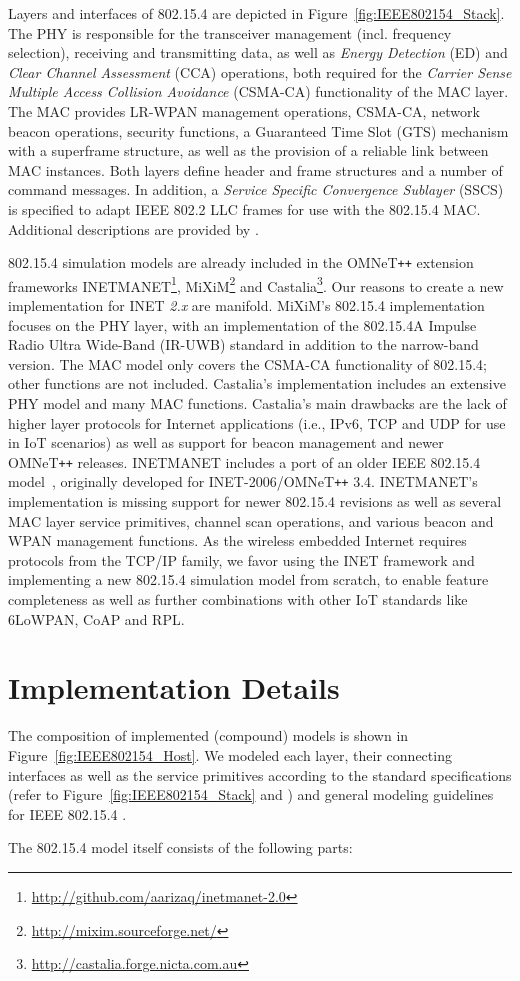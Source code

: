 \documentclass[conference,10pt]{IEEEtran}
\newcommand{\omnet}{{OMNeT\texttt{++}}\xspace}
\begin{document}
Layers and interfaces of 802.15.4 are depicted in Figure~\ref{fig:IEEE802154_Stack}. 
The PHY is responsible for the transceiver management (incl. frequency selection), receiving and transmitting data, as well as \emph{Energy Detection} (ED) and \emph{Clear Channel Assessment} (CCA) operations, both required for the \emph{Carrier Sense Multiple Access Collision Avoidance} (CSMA-CA) functionality of the MAC layer.
The MAC provides LR-WPAN management operations, CSMA-CA, network beacon operations, security functions, a Guaranteed Time Slot (GTS) mechanism with a superframe structure, as well as the provision of a reliable link between MAC instances.
Both layers define header and frame structures and a number of command messages.
In addition, a \emph{Service Specific Convergence Sublayer} (SSCS) is specified to adapt IEEE 802.2 LLC frames for use with the 802.15.4 MAC.
Additional descriptions are provided by \cite{IEEE802154}.
\par
802.15.4 simulation models are already included in the \omnet extension frameworks INETMANET\footnote{\url{http://github.com/aarizaq/inetmanet-2.0}}, MiXiM\footnote{\url{http://mixim.sourceforge.net/}} and Castalia\footnote{\url{http://castalia.forge.nicta.com.au}}.
Our reasons to create a new implementation for INET \emph{2.x} are manifold.
MiXiM's 802.15.4 implementation focuses on the PHY layer, with an implementation of the 802.15.4A Impulse Radio Ultra Wide-Band (IR-UWB) standard in addition to the narrow-band version. 
The MAC model only covers the CSMA-CA functionality of 802.15.4; other functions are not included.
Castalia's implementation includes an extensive PHY model and many MAC functions.
Castalia's main drawbacks are the lack of higher layer protocols for Internet applications (i.e., IPv6, TCP and UDP for use in IoT scenarios) as well as support for beacon management and newer \omnet releases.
INETMANET includes a port of an older IEEE 802.15.4 model~\cite{chen2007simulation}, originally developed for INET-2006/\omnet 3.4.
INETMANET's implementation is missing support for newer 802.15.4 revisions as well as several MAC layer service primitives, channel scan operations, and various beacon and WPAN management functions.
As the wireless embedded Internet requires protocols from the TCP/IP family, we favor using the INET framework and implementing a new 802.15.4 simulation model from scratch, to enable feature completeness as well as further combinations with other IoT standards like 6LoWPAN, CoAP and RPL.

\section{Implementation Details}
\label{sec:implementation-details}
The composition of implemented (compound) models is shown in Figure~\ref{fig:IEEE802154_Host}.
We modeled each layer, their connecting interfaces as well as the service primitives according to the standard specifications (refer to Figure~\ref{fig:IEEE802154_Stack} and \cite{IEEE802154}) and general modeling guidelines for IEEE 802.15.4 \cite[Sec. 12.3]{wehrle2010modeling}.
\par
The 802.15.4 model itself consists of the following parts:
\end{document}
